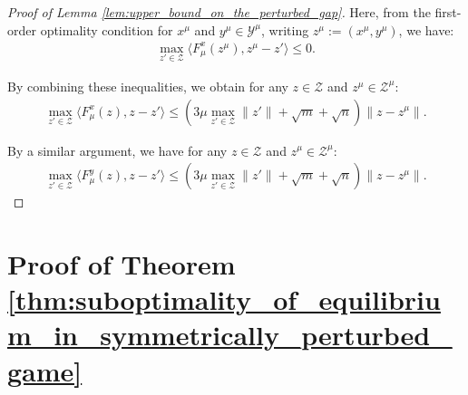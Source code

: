 \documentclass{article}
\newcommand{\Y}{\mathcal{Y}}
\newcommand{\Z}{\mathcal{Z}}
\theoremstyle{plain}
\begin{document}
\begin{proof}[Proof of Lemma \ref{lem:upper_bound_on_the_perturbed_gap}]
    Here, from the first-order optimality condition for $x^{\mu}$ and $y^{\mu}\in \Y^{\mu}$, writing $z^{\mu} := (x^{\mu}, y^{\mu})$, we have:
    \begin{align*}
        \max_{z'\in \Z}\langle F_{\mu}^x(z^{\mu}), z^{\mu} - z'\rangle \leq 0.
    \end{align*}

    By combining these inequalities, we obtain for any $z\in \Z$ and $z^{\mu}\in \Z^{\mu}$:
    \begin{align*}
        \max_{z'\in \Z}\langle F_{\mu}^x(z), z - z'\rangle \leq \left(3\mu\max_{z'\in \Z}\|z'\| + \sqrt{m} + \sqrt{n}\right) \|z - z^{\mu}\|.
    \end{align*}

    By a similar argument, we have for any $z\in \Z$ and $z^{\mu}\in \Z^{\mu}$:
    \begin{align*}
        \max_{z'\in \Z}\langle F_{\mu}^y(z), z - z'\rangle \leq \left(3\mu\max_{z'\in \Z}\|z'\| + \sqrt{m} + \sqrt{n}\right) \|z - z^{\mu}\|.
    \end{align*}
\end{proof}


\section{Proof of Theorem \ref{thm:suboptimality_of_equilibrium_in_symmetrically_perturbed_game}}
\label{sec:appx_proof_for_suboptimality}
\end{document}
